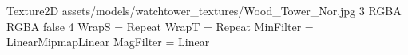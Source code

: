 Texture2D
assets/models/watchtower_textures/Wood_Tower_Nor.jpg
3
RGBA
RGBA
false
4
WrapS = Repeat
WrapT = Repeat
MinFilter = LinearMipmapLinear
MagFilter = Linear
